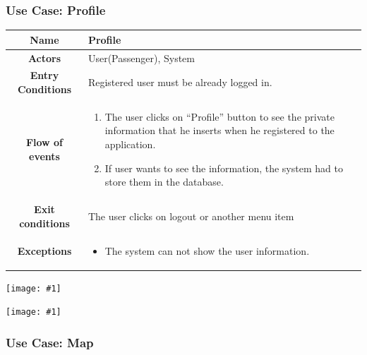 \documentclass[11pt, a4paper,titlepage]{article}
\newcommand{\image}[1]{
	\begin{center}
		\noindent \texttt{[image: \#1]}
	\end{center}
	}
\begin{document}
\subsubsection{Use Case: Profile}
	\begin{tabularx}{\textwidth}{| c | X |}
		\hline
		\textbf{Name} & 
		Profile
		\\
		\hline
		\textbf{Actors} & 
		User(Passenger), System 
		\\
		\hline
		\textbf{Entry Conditions} &
		Registered user must be already logged in. 
		\\
		\hline
		\textbf{Flow of events} & 
		\begin{enumerate}
			\item The user clicks on “Profile” button to see the private information that he inserts when he registered to the application.
			\item If user wants to see the information, the system had to store them in the database.
				
		\end{enumerate}						
		\\
		\hline
		\textbf{Exit conditions} & 
		The user clicks on logout or another menu item
		\\
		\hline
		\textbf{Exceptions} & 
		\begin{itemize}
			\item The system can not show the user information.
		\end{itemize} 
		\\
		\hline		
	\end{tabularx}
	\image{usecase_profile.png}
	\image{diagram_sequence_profile.png}
	\newpage
\subsubsection{Use Case: Map}
\end{document}
